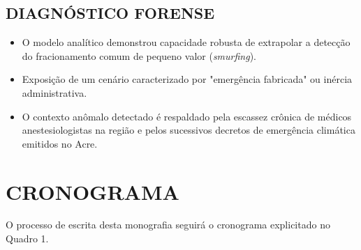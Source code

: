\documentclass[
    12pt,               %
    openright,          %
    oneside,            %
    a4paper,            %
    chapter=TITLE,      %
    sumario=tradicional,%
    english,            %
    brazilian,          %
 ]{abntex2}
\begin{document}
\section{DIAGNÓSTICO FORENSE}
\begin{itemize}
    \item O modelo analítico demonstrou capacidade robusta de extrapolar a detecção do fracionamento comum de pequeno valor (\textit{smurfing}).
    \item Exposição de um cenário caracterizado por "emergência fabricada" ou inércia administrativa.
    \item O contexto anômalo detectado é respaldado pela escassez crônica de médicos anestesiologistas na região e pelos sucessivos decretos de emergência climática emitidos no Acre.
\end{itemize}

\chapter{CRONOGRAMA}\label{sec:cronograma}
O processo de escrita desta monografia seguirá o cronograma explicitado no Quadro 1.
\end{document}
